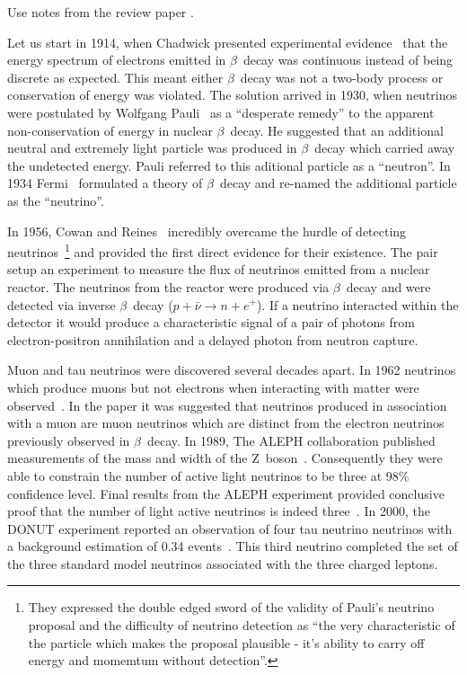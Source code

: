Use notes from the review paper \cite{LBNReview_Rubbia}.

Let us start in 1914, when Chadwick presented experimental
evidence~\cite{chadwick1914distribution} that the energy spectrum of
electrons emitted in $\beta$~decay was continuous instead of being
discrete as expected. This meant either $\beta$~decay was not a
two-body process or conservation of energy was violated.   
The solution arrived in 1930, when neutrinos were postulated by
Wolfgang Pauli~\cite{pauli1930letter} as a ``desperate remedy'' to the
apparent non-conservation of energy in nuclear $\beta$~decay. He
suggested that an additional neutral and extremely light
particle was produced in $\beta$~decay which carried away
the undetected energy.  
Pauli referred to this aditional particle as a ``neutron''. In 1934
Fermi~\cite{fermi1934tentativo} formulated a theory of $\beta$~decay
and re-named the additional particle as the ``neutrino''.

In 1956, Cowan and Reines~\cite{Reines:1956rs} incredibly overcame the
hurdle of detecting neutrinos~\footnote{They expressed the
  double edged sword of the validity of Pauli's neutrino proposal and
  the difficulty of neutrino detection as “the very characteristic of
  the particle which makes the proposal plausible - it’s ability to
  carry off energy and momemtum without detection”.} 
and provided the first
direct evidence for their existence. The pair setup an experiment to
measure the flux of neutrinos emitted from a nuclear reactor. The
neutrinos from the reactor were produced via $\beta$~decay and were
detected via inverse $\beta$~decay ($p + \bar{\nu} \rightarrow n +
e^+$). If a neutrino interacted within the detector it would produce a
characteristic signal of a pair of photons from electron-positron
annihilation and a delayed photon from neutron capture.

Muon and tau neutrinos were discovered several decades apart.
In 1962 neutrinos which produce muons but not electrons when
interacting with matter were
observed~\cite{MuonNeutrino:PhysRevLett.9.36}. In the paper it was
suggested that neutrinos produced in association
with a muon are muon neutrinos which are distinct
from the electron neutrinos previously observed in $\beta$~decay. 
In 1989, The ALEPH collaboration published measurements of the mass
and width of the Z~boson~\cite{ZWidth:Decamp:1989tu}. Consequently
they were able to constrain the 
number of active light neutrinos to be three at 98\% confidence level.
Final results from the ALEPH experiment provided conclusive proof that
the number of light active neutrinos is indeed three~\cite{ALEPH:2005ab}.
In 2000, the DONUT experiment reported an observation of four tau
neutrino neutrinos with a background estimation of 0.34
events~\cite{nutau:Kodama:2000mp}. This third neutrino completed the
set of the three standard model neutrinos associated with the three
charged leptons. 


